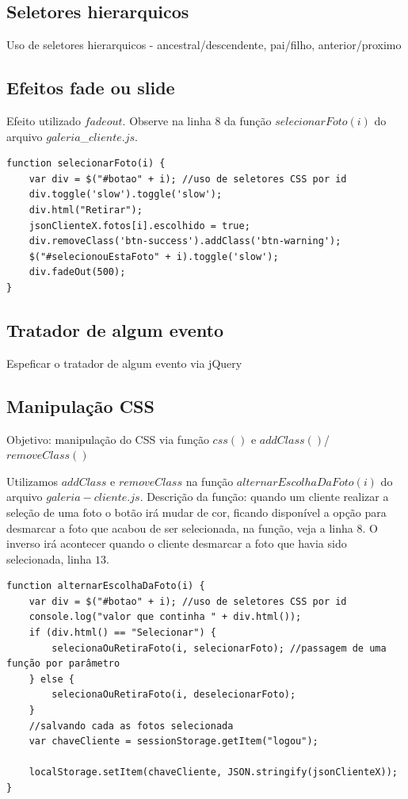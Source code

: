 \subsection{Seletores hierarquicos}
Uso de seletores hierarquicos - ancestral/descendente, pai/filho, anterior/proximo
\subsection{Efeitos fade ou slide}

	Efeito utilizado $fadeout$.
	Observe na linha $8$ da função $selecionarFoto(i)$ do arquivo $galeria$\_$cliente.js$.
	
\begin{lstlisting}	
function selecionarFoto(i) {
    var div = $("#botao" + i); //uso de seletores CSS por id
    div.toggle('slow').toggle('slow');
    div.html("Retirar");
    jsonClienteX.fotos[i].escolhido = true;
    div.removeClass('btn-success').addClass('btn-warning');
    $("#selecionouEstaFoto" + i).toggle('slow');
    div.fadeOut(500);
}
\end{lstlisting}

\subsection{Tratador de algum evento}
Espeficar o tratador de algum evento via jQuery
\subsection{Manipulação CSS}
	Objetivo: manipulação do CSS via função $css()$ e $addClass()$/$removeClass()$

	Utilizamos $addClass$ e $removeClass$ na função $alternarEscolhaDaFoto(i)$ do arquivo $galeria-cliente.js$. 
	Descrição da função: quando um cliente realizar a seleção de uma foto o botão irá mudar de cor, ficando disponível a opção para desmarcar a foto que acabou de ser selecionada, na função, veja a linha $8$. O inverso irá acontecer quando o cliente desmarcar a foto que havia sido selecionada, linha $13$.
	

\begin{lstlisting}
function alternarEscolhaDaFoto(i) {
    var div = $("#botao" + i); //uso de seletores CSS por id
    console.log("valor que continha " + div.html());
    if (div.html() == "Selecionar") {
        selecionaOuRetiraFoto(i, selecionarFoto); //passagem de uma função por parâmetro
    } else {
        selecionaOuRetiraFoto(i, deselecionarFoto);
    }
    //salvando cada as fotos selecionada
    var chaveCliente = sessionStorage.getItem("logou");

    localStorage.setItem(chaveCliente, JSON.stringify(jsonClienteX));
}
\end{lstlisting}

